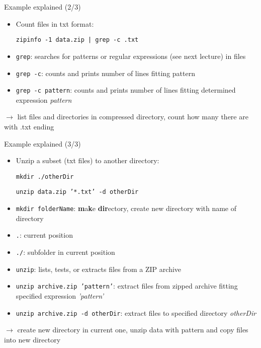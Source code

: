 \documentclass[hyperref={pdfpagelabels=false},aspectratio=169]{beamer}
\begin{document}
\begin{frame}{Example explained \small (2/3)}

    \begin{itemize}
        \item[2.] Count files in txt format:

        \texttt{zipinfo -1 data.zip | grep -c .txt}
    \end{itemize}
    
    \begin{itemize}
        \item \texttt{grep}: searches for patterns or regular expressions (see next lecture) in files
        \item \texttt{grep -c}: counts and prints number of lines fitting pattern
        \item \texttt{grep -c pattern}: counts and prints number of lines fitting determined expression \textit{pattern}
    \end{itemize}
    
    \vspace{10pt}

    $\rightarrow$ list files and directories in compressed directory, count how many there are with .txt ending
\end{frame}

\begin{frame}{Example explained \small (3/3)}

    \begin{itemize}
        \item[3.] Unzip a subset (txt files) to another directory: 
        
        \texttt{mkdir ./otherDir}

        \texttt{unzip data.zip '*.txt' -d otherDir}
    \end{itemize}
    
    \begin{itemize}
        \item \texttt{mkdir folderName}: \textbf{m}a\textbf{k}e \textbf{dir}ectory, create new directory with name of directory
        \item \texttt{.}: current position
        \item \texttt{./}: subfolder in current position
        \item \texttt{unzip}: lists, tests, or extracts files from a ZIP archive
        \item \texttt{unzip archive.zip 'pattern'}: extract files from zipped archive fitting specified expression \textit{'pattern'} 
        \item \texttt{unzip archive.zip -d otherDir}: extract files to specified directory \textit{otherDir}
    \end{itemize}
    
    \vspace{10pt}

    $\rightarrow$ create new directory in current one, unzip data with pattern and copy files into new directory
\end{frame}
\end{document}
